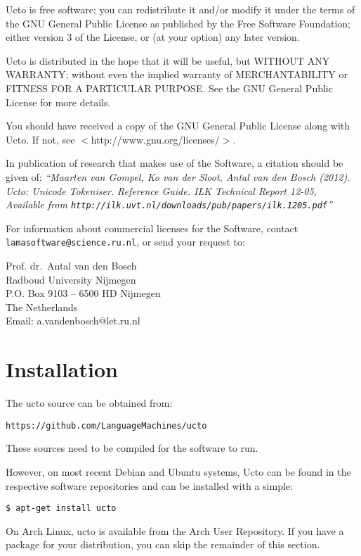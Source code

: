 \documentclass[a4paper,12pt]{report}
\begin{document}
Ucto is free software; you can redistribute it and/or modify it under the terms of the GNU General Public License as published by the Free
Software Foundation; either version 3 of the License, or (at your option) any later version.

Ucto is distributed in the hope that it will be useful, but WITHOUT ANY WARRANTY; without even the implied warranty of MERCHANTABILITY or FITNESS FOR A PARTICULAR PURPOSE.  See the GNU General Public License for more details.

You should have received a copy of the GNU General Public License along with Ucto.  If not, see $<$http://www.gnu.org/licenses/$>$.

In publication of research that makes use of the Software, a citation should be given of: {\em ``Maarten van Gompel, Ko van der Sloot, Antal van den Bosch (2012). Ucto: Unicode Tokeniser. Reference Guide. ILK Technical Report 12-05, \\ Available from {\tt http://ilk.uvt.nl/downloads/pub/papers/ilk.1205.pdf}''}

For information about commercial licenses for the Software, contact {\tt
lamasoftware@science.ru.nl}, or send your request to:

{\footnotesize
Prof. dr.~Antal van den Bosch\\
Radboud University Nijmegen \\
P.O. Box 9103  -- 6500 HD Nijmegen \\
The Netherlands \\
Email: a.vandenbosch@let.ru.nl}

\pagestyle{headings}

\chapter{Installation}
\vspace{-1cm}

The ucto source can be obtained from:

{\tt https://github.com/LanguageMachines/ucto}

These sources need to be compiled for the software to run.

However, on most recent Debian and Ubuntu systems, Ucto can be found in the respective software repositories and can be installed with a simple:

{\tt \$ apt-get install ucto}

On Arch Linux, ucto is available from the Arch User Repository. If you have a
package for your distribution, you can skip the remainder of this section.
\end{document}
